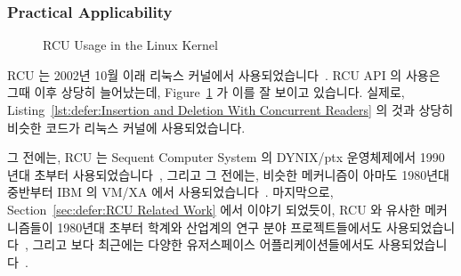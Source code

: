 \subsubsection{Practical Applicability}
\label{sec:defer:Practical Applicability}

\begin{figure}[tb]
\centering
{}
\caption{RCU Usage in the Linux Kernel}
\label{fig:defer:RCU Usage in the Linux Kernel}
\end{figure}

RCU 는 2002년 10월 이래 리눅스 커널에서 사용되었습니다~\cite{Torvalds2.5.43}.
RCU API 의 사용은 그때 이후 상당히 늘어났는데,
Figure~\ref{fig:defer:RCU Usage in the Linux Kernel} 가 이를 잘 보이고
있습니다.
실제로,
Listing~\ref{lst:defer:Insertion and Deletion With Concurrent Readers}
의 것과 상당히 비슷한 코드가 리눅스 커널에 사용되었습니다.

그 전에는,  RCU 는 Sequent Computer System 의 DYNIX/ptx 운영체제에서 1990년대
초부터 사용되었습니다~\cite{McKenney98}, 그리고 그 전에는, 비슷한 메커니즘이
아마도 1980년대 중반부터 IBM 의 VM/XA 에서 사용되었습니다~\cite{Hennessy89}.
마지막으로,
Section~\ref{sec:defer:RCU Related Work} 에서 이야기 되었듯이, RCU 와 유사한
메커니즘들이 1980년대 초부터 학계와 산업계의 연구 분야 프로젝트들에서도
사용되었습니다~\cite{Kung80}, 그리고 보다 최근에는 다양한 유저스페이스
어플리케이션들에서도
사용되었습니다~\cite{MathieuDesnoyers2009URCU,MikeDay2013RCUqemu,GeoffRomer2018C++DeferredReclamationP0561R4}.
\iffalse

